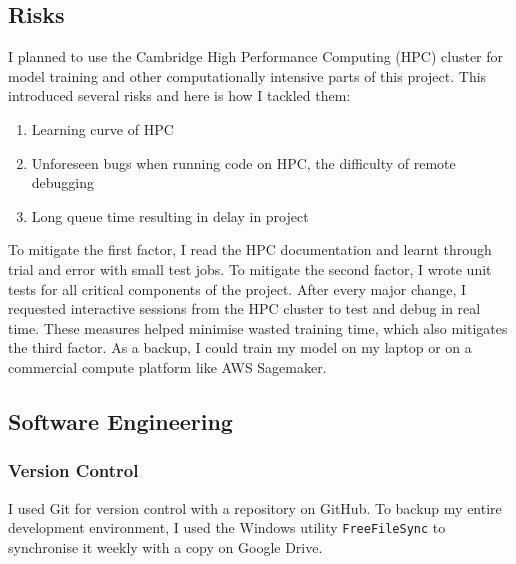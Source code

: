 \documentclass[12pt,a4paper,twoside,openany]{report}
\begin{document}
\subsection{Risks}
I planned to use the Cambridge High Performance Computing (HPC) cluster for model training and other computationally intensive parts of this project. This introduced several risks and here is how I tackled them:
\begin{enumerate}
    \item Learning curve of HPC
    \item Unforeseen bugs when running code on HPC, the difficulty of remote debugging
    \item Long queue time resulting in delay in project
\end{enumerate}
To mitigate the first factor, I read the HPC documentation and learnt through trial and error with small test jobs. To mitigate the second factor, I wrote unit tests for all critical components of the project. After every major change, I requested interactive sessions from the HPC cluster to test and debug in real time. These measures helped minimise wasted training time, which also mitigates the third factor. As a backup, I could train my model on my laptop or on a commercial compute platform like AWS Sagemaker.

\subsection{Software Engineering}

\subsubsection{Version Control}
I used Git for version control with a repository on GitHub. 
To backup my entire development environment, I used the Windows utility \verb|FreeFileSync| to synchronise it weekly with a copy on Google Drive.
\end{document}

